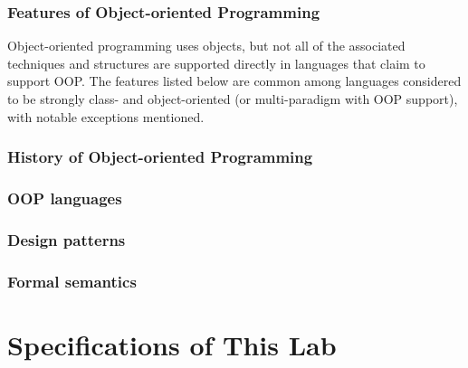 \documentclass[a4paper]{report}
\begin{document}
\subsection{Features of Object-oriented Programming}
Object-oriented programming uses objects, but not all of the associated techniques and structures are supported directly in languages that claim to support OOP. The features listed below are common among languages considered to be strongly class- and object-oriented (or multi-paradigm with OOP support), with notable exceptions mentioned.


\subsection{History of Object-oriented Programming}


\subsection{OOP languages}


\subsection{Design patterns}

\subsection{Formal semantics}




\chapter{Specifications of This Lab}
\end{document}
